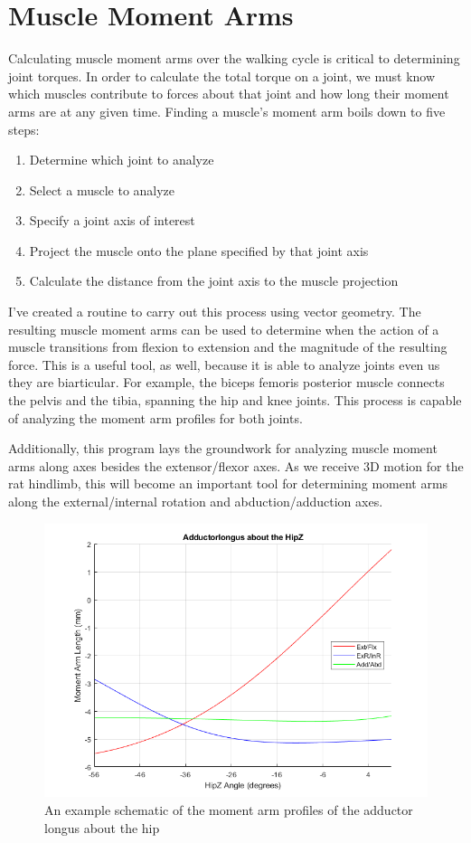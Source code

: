 \documentclass[runningheads,a4paper]{llncs}
\begin{document}
	\section{Muscle Moment Arms}
	Calculating muscle moment arms over the walking cycle is critical to determining joint torques. In order to calculate the total torque on a joint, we must know which muscles contribute to forces about that joint and how long their moment arms are at any given time. Finding a muscle's moment arm boils down to five steps:
		\begin{enumerate}
		  \item Determine which joint to analyze
		  \item Select a muscle to analyze
		  \item Specify a joint axis of interest
		  \item Project the muscle onto the plane specified by that joint axis
		  \item Calculate the distance from the joint axis to the muscle projection
		\end{enumerate}
	I've created a routine to carry out this process using vector geometry. The resulting muscle moment arms can be used to determine when the action of a muscle transitions from flexion to extension and the magnitude of the resulting force. This is a useful tool, as well, because it is able to analyze joints even us they are biarticular. For example, the biceps femoris posterior muscle connects the pelvis and the tibia, spanning the hip and knee joints. This process is capable of analyzing the moment arm profiles for both joints. \par
	Additionally, this program lays the groundwork for analyzing muscle moment arms along axes besides the extensor/flexor axes. As we receive 3D motion for the rat hindlimb, this will become an important tool for determining moment arms along the external/internal rotation and abduction/adduction axes.
		\begin{figure}
			\centering
			\includegraphics[width=.7\textwidth]{mom1.png}
			\caption{An example schematic of the moment arm profiles of the adductor longus about the hip}
			\label{fig:mom1}
		\end{figure}
\end{document}
